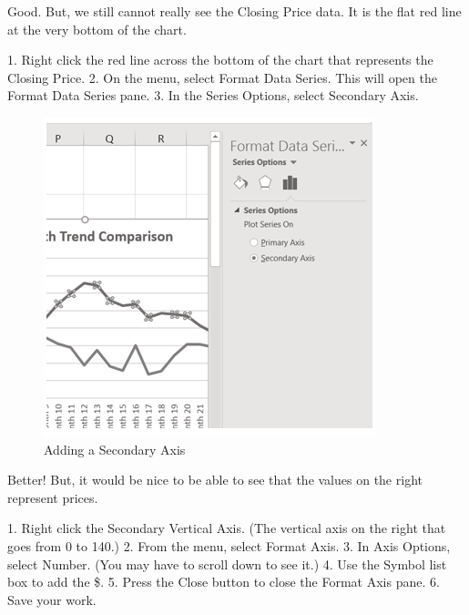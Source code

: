 Good. But, we still cannot really see the Closing Price data. It is the flat red line at the very bottom of
the chart.

1. Right click the red line across the bottom of the chart that represents the Closing Price.
2. On the menu, select Format Data Series. This will open the Format Data Series pane.
3. In the Series Options, select Secondary Axis.


\begin{figure}[H]
	\centering
	\includegraphics[width=\maxwidth{.95\linewidth}]{gfx/ch04_fig10}
	\caption{Adding a Secondary Axis}
	\label{04:fig10}
\end{figure}





Better! But, it would be nice to be able to see that the values on the right represent prices.

1.   Right click the Secondary Vertical Axis. (The vertical axis on the right that goes from 0 to 140.)
2.   From the menu, select Format Axis.
3.   In Axis Options, select Number. (You may have to scroll down to see it.)
4.   Use the Symbol list box to add the \$.
5.   Press the Close button to close the Format Axis pane.
6.   Save your work.



